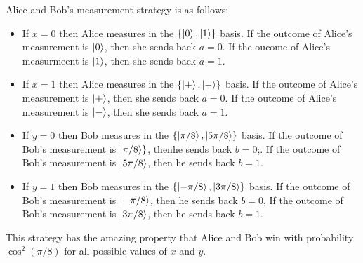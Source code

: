Alice and Bob's measurement strategy is as follows:
\begin{itemize}
    \item If $x=0$ then Alice measures in the $\{\ket{0},\ket{1}\}$ basis. If the outcome of Alice's measurement is $\ket{0}$, then she sends back $a=0$. If the oucome of Alice's measurmeent is $\ket{1}$, then she sends back $a=1$.
    \item If $x=1$ then Alice measures in the $\{\ket{+},\ket{-}\}$ basis. If the outcome of Alice's measurement is $\ket{+}$, then she sends back $a=0$. If the outcome of Alice's measurement is $\ket{-}$, then she sends back $a=1$.
    \item If $y=0$ then Bob measures in the $\{\ket{\pi/8},\ket{5\pi/8}\}$ basis. If the outcome of Bob's measurement is $\ket{\pi/8}\}$, thenhe sends back $b=0$;. If the outcome of Bob's measurement is $\ket{5\pi/8}$, then he sends back $b=1$.
    \item If $y=1$ then Bob measures in the $\{\ket{-\pi/8},\ket{3\pi/8}\}$ basis. If the outcome of Bob's measurement is $\ket{-\pi/8}$, then he sends back $b=0$, If the outcome of Bob's measurement is $\ket{3\pi/8}$, then he sends back $b=1$.
\end{itemize}
This strategy has the amazing property that Alice and Bob win with probability $\cos^2(\pi/8)$ for all possible values of $x$ and $y$.

